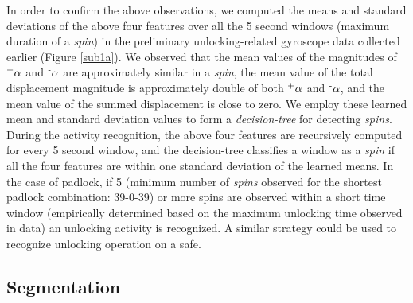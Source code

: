 \documentclass[]{IEEEtran}
\begin{document}
In order to confirm the above observations, we computed the means and standard deviations of the above four features over all the 5 second windows (maximum duration of a \textit{spin}) in the preliminary unlocking-related gyroscope data collected earlier (Figure \ref{sub1a}). We observed that the mean values of the magnitudes of $\textsuperscript{+}\alpha$ and $\textsuperscript{-}\alpha$ are approximately similar in a \textit{spin}, the mean value of the total displacement magnitude is approximately double of both $\textsuperscript{+}\alpha$ and $\textsuperscript{-}\alpha$, and the mean value of the summed displacement is close to zero. 
We employ these learned mean and standard deviation values to form a \emph{decision-tree} for detecting \textit{spins}. During the activity recognition, the above four features are recursively computed for every 5 second window, and the decision-tree classifies a window as a \textit{spin} if all the four features are within one standard deviation of the learned means. 
In the case of padlock, if 5 (minimum number of \textit{spins} observed for the shortest padlock combination: 39-0-39) or more spins are observed within a short time window (empirically determined based on the maximum unlocking time observed in data) an unlocking activity is recognized. A similar strategy could be used to recognize unlocking operation on a safe.

\subsection{Segmentation}
\label{segment}
\end{document}

